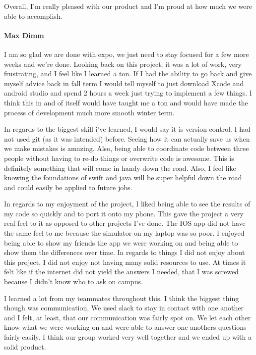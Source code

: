 Overall, I'm really pleased with our product and I'm proud at how much we were able to accomplish.

			\paragraph{Max Dimm}
			I am so glad we are done with expo, we just need to stay focused for a few more weeks and we're done. Looking back on this project, it was a lot of work, very frustrating, and I feel like I learned a ton. If I had the ability to go back and give myself advice back in fall term I would tell myself to just download Xcode and android studio and spend 2 hours a week just trying to implement a few things. I think this in and of itself would have taught me a ton and would have made the process of development much more smooth winter term.

In regards to the biggest skill i've learned, I would say it is version control. I had not used git (as it was intended) before. Seeing how it can actually save us when we make mistakes is amazing. Also, being able to coordinate code between three people without having to re-do things or overwrite code is awesome. This is definitely something that will come in handy down the road. Also, I feel like knowing the foundations of swift and java will be super helpful down the road and could easily be applied to future jobs.

In regards to my enjoyment of the project, I liked being able to see the results of my code so quickly and to port it onto my phone. This gave the project a very real feel to it as opposed to other projects I've done. The IOS app did not have the same feel to me because the simulator on my laptop was so poor. I enjoyed being able to show my friends the app we were working on and being able to show them the differences over time. In regards to things I did not enjoy about this project, I did not enjoy not having many solid resources to use. At times it felt like if the internet did not yield the answers I needed, that I was screwed because I didn't know who to ask on campus.

I learned a lot from my teammates throughout this. I think the biggest thing though was communication. We used slack to stay in contact with one another and I felt, at least, that our communication was fairly spot on. We let each other know what we were working on and were able to answer one anothers questions fairly easily. I think our group worked very well together and we ended up with a solid product.

